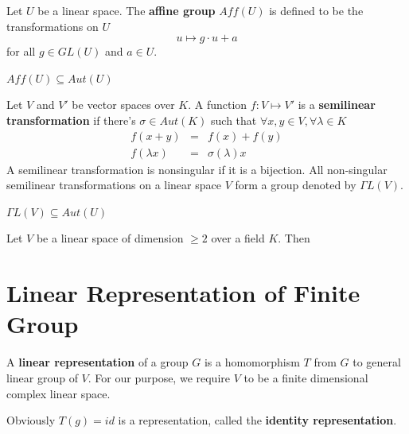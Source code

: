 \documentclass[12pt]{book}
\begin{document}
\begin{definition}
	Let $U$ be a linear space. The {\bf affine group} $Aff(U)$ is defined to be the transformations on $U$
	\begin{equation}
		u\mapsto g\cdot u+a
	\end{equation}
	for all $g\in GL(U)$ and $a\in U$.
\end{definition}

\begin{lemma}
	$Aff(U)\subseteq Aut(U)$
\end{lemma}

\begin{definition}
	Let $V$ and $V'$ be vector spaces over $K$. A function $f:V\mapsto V'$ is a {\bf semilinear transformation} if there's $\sigma\in Aut(K)$ such that $\forall x,y\in V,\forall\lambda\in K$
	\begin{eqnarray}
		f(x+y)&=&f(x)+f(y)\\
		f(\lambda x)&=&\sigma(\lambda)x
	\end{eqnarray}
	A semilinear transformation is nonsingular if it is a bijection. All non-singular semilinear transformations on a linear space $V$ form a group denoted by $\Gamma L(V)$.
\end{definition}

\begin{lemma}
	$\Gamma L(V)\subseteq Aut(U)$
\end{lemma}

\begin{lemma}
	Let $V$ be a linear space of dimension $\geq 2$ over a field $K$. Then
\end{lemma}


	
	\chapter{Linear Representation of Finite Group}
	
	\begin{definition}
		
	A \textbf{linear representation} of a group $G$ is a homomorphism $T$ from $G$ to general linear group of $V$. For our purpose, we require $V$ to be  a finite dimensional complex linear space.
	\end{definition}
	
	\begin{example}
	Obviously $T(g)=id$ is a representation, called the \textbf{identity representation}.
	\end{example}
\end{document}
